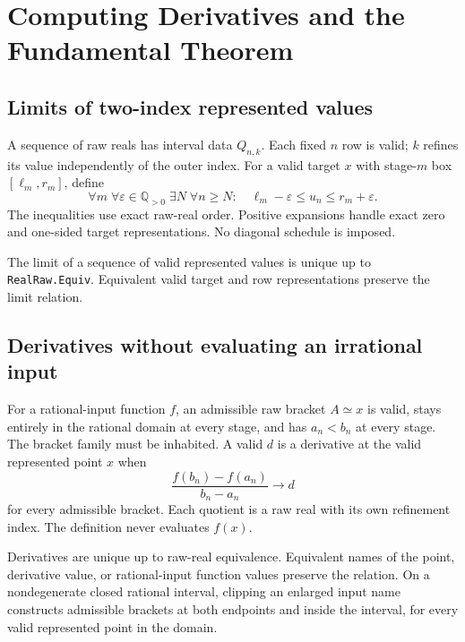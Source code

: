\chapter{Computing Derivatives and the Fundamental Theorem}

\section{Limits of two-index represented values}

A sequence of raw reals has interval data \(Q_{n,k}\). Each fixed \(n\)
row is valid; \(k\) refines its value independently of the outer index.
For a valid target \(x\) with stage-\(m\) box \([\ell_m,r_m]\), define
\[
 \forall m\;\forall\varepsilon\in\mathbb Q_{>0}\;
 \exists N\;\forall n\ge N:\quad
 \ell_m-\varepsilon\le u_n\le r_m+\varepsilon.
\]
The inequalities use exact raw-real order. Positive expansions handle exact
zero and one-sided target representations. No diagonal schedule is imposed.

\begin{theorem}
\label{thm:raw-limit-invariance}
\leanok
The limit of a sequence of valid represented values is unique up to
\texttt{RealRaw.Equiv}. Equivalent valid target and row representations
preserve the limit relation.
\end{theorem}

\section{Derivatives without evaluating an irrational input}

For a rational-input function \(f\), an admissible raw bracket \(A\simeq x\)
is valid, stays entirely in the rational domain at every stage, and has
\(a_n<b_n\) at every stage. The bracket family must be inhabited.
A valid \(d\) is a derivative at the valid represented point \(x\) when
\[
 \frac{f(b_n)-f(a_n)}{b_n-a_n}\longrightarrow d
\]
for every admissible bracket. Each quotient is a raw real with its own
refinement index. The definition never evaluates \(f(x)\).

\begin{theorem}
\label{thm:bracket-derivative-invariance}
\leanok
Derivatives are unique up to raw-real equivalence. Equivalent names of the
point, derivative value, or rational-input function values preserve the
relation. On a nondegenerate closed rational interval, clipping an enlarged
input name constructs admissible brackets at both endpoints and inside the
interval, for every valid represented point in the domain.
\end{theorem}

